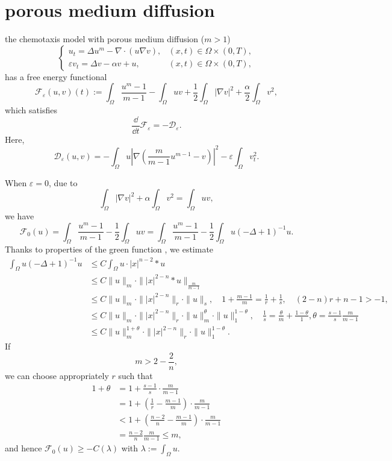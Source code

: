 \section{porous medium diffusion}
the chemotaxis model with porous medium diffusion ($m>1$)
\begin{equation}
	\begin{cases}
		u_t = \Delta u^m - \nabla \cdot ( u\nabla v), & (x,t)\in\Omega\times(0,T),\\
		\varepsilon v_t = \Delta v - \alpha v + u, & (x,t)\in\Omega\times(0,T),
	\end{cases}
\end{equation}
has a free energy functional
\begin{equation}
	\mathcal{F}_\varepsilon(u,v)(t) :=  \int_\Omega \frac{u^m-1}{m-1} - \int_\Omega uv 
		+ \frac{1}{2}\int_\Omega |\nabla v|^2 + \frac{\alpha}{2}\int_\Omega v^2,
\end{equation}
which satisfies 
\begin{equation}
	\frac{\dd}{\dd t}\mathcal{F}_\varepsilon = - \mathcal{D}_\varepsilon.
\end{equation}
Here, 
\begin{equation*}
	\mathcal{D}_\varepsilon(u,v) 
		= - \int_\Omega u\left|\nabla\left(\frac{m}{m-1}u^{m-1} - v\right)\right|^2
			- \varepsilon\int_\Omega v_t^2.
\end{equation*}

When $\varepsilon = 0$, due to
\[
	\int_\Omega |\nabla v|^2 + \alpha\int_\Omega v^2 = \int_\Omega uv,
\]
we have
\begin{equation}
	\mathcal{F}_0(u) = \int_\Omega \frac{u^m-1}{m-1} - \frac{1}{2}\int_\Omega uv 
		= \int_\Omega\frac{u^m-1}{m-1} - \frac{1}{2}\int_\Omega u(-\Delta + 1)^{-1}u.
\end{equation}
Thanks to properties of the green function \cite{Grueter1982},
we estimate
\begin{align*}
	\int_\Omega u(-\Delta+1)^{-1}u 
		&\leq C\int_\Omega u\cdot |x|^{n-2}*u\\
		&\leq C\|u\|_m\cdot \||x|^{2-n}*u\|_{\frac{m}{m-1}}\\
		&\leq C\|u\|_m \cdot \||x|^{2-n}\|_r\cdot\|u\|_s,\quad 1+\frac{m-1}{m} = \frac{1}{r} + \frac{1}{s},
			\quad (2-n)r + n-1 > -1,\\
		&\leq C\|u\|_m\cdot \||x|^{2-n}\|_r\cdot\|u\|_m^{\theta}\cdot\|u\|_1^{1-\theta},
			\quad \frac{1}{s} = \frac{\theta}{m} + \frac{1-\theta}{1}, \theta = \frac{s-1}{s}\frac{m}{m-1}\\
		&\leq C\|u\|_m^{1+\theta}\cdot \||x|^{2-n}\|_r\cdot\|u\|_1^{1-\theta}.
\end{align*}
If 
\[
	m > 2-\frac2n,
\]
we can choose appropriately $r$ such that 
\begin{align*}
	1+\theta 
		&= 1+\frac{s-1}{s}\cdot\frac{m}{m-1}\\
		&= 1 + \left(\frac1r-\frac{m-1}{m}\right)\cdot\frac{m}{m-1}\\
		&< 1 + \left(\frac{n-2}{n} - \frac{m-1}{m}\right)\cdot\frac{m}{m-1}\\
		&= \frac{n-2}{n}\frac{m}{m-1}\leq m,
\end{align*} 
and hence $\mathcal{F}_0(u) \geq - C(\lambda)$ with $\lambda := \int_\Omega u$.


